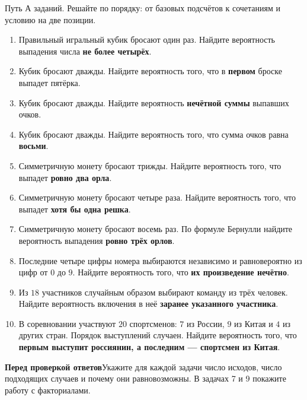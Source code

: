 \documentclass[a4paper,11pt]{article}
\newcommand{\teachsection}[1]{\vspace{5pt}{\color{darkaccent}\large\bfseries #1}\par\vspace{2pt}{\color{accent}\rule{\linewidth}{0.4pt}}\par\vspace{1pt}}
\begin{document}
\clearpage
\teachsection{Тренировочный блок}
\textcolor{softgray}{Путь А \;\textbullet{} заданий. Решайте по порядку: от базовых подсчётов к сочетаниям и условию на две позиции.}
\begin{enumerate}[label=\textcolor{darkaccent}{\textbf{\arabic*.}}]
\item Правильный игральный кубик бросают один раз. Найдите вероятность выпадения числа \textbf{не более четырёх}.
\item Кубик бросают дважды. Найдите вероятность того, что в \textbf{первом} броске выпадет пятёрка.
\item Кубик бросают дважды. Найдите вероятность \textbf{нечётной суммы} выпавших очков.
\item Кубик бросают дважды. Найдите вероятность того, что сумма очков равна \textbf{восьми}.
\item Симметричную монету бросают трижды. Найдите вероятность того, что выпадет \textbf{ровно два орла}.
\item Симметричную монету бросают четыре раза. Найдите вероятность того, что выпадет \textbf{хотя бы одна решка}.
\item Симметричную монету бросают восемь раз. По формуле Бернулли найдите вероятность выпадения \textbf{ровно трёх орлов}.
\item Последние четыре цифры номера выбираются независимо и равновероятно из цифр от $0$ до $9$. Найдите вероятность того, что \textbf{их произведение нечётно}.
\item Из $18$ участников случайным образом выбирают команду из трёх человек. Найдите вероятность включения в неё \textbf{заранее указанного участника}.
\item В соревновании участвуют $20$ спортсменов: $7$ из России, $9$ из Китая и $4$ из других стран. Порядок выступлений случаен. Найдите вероятность того, что \textbf{первым выступит россиянин, а последним --- спортсмен из Китая}.
\end{enumerate}
\vspace{5mm}
\textcolor{darkaccent}{\textbf{Перед проверкой ответов}}\quad Укажите для каждой задачи число исходов, число подходящих случаев и почему они равновозможны. В задачах 7 и 9 покажите работу с факториалами.
\end{document}
